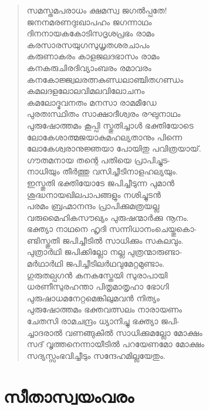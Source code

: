 \begin{verse}
സമസ്തമപരാധം ക്ഷമസ്വ ജഗല്‍പ്പതേ!\\
ജനനമരണദുഃഖാപഹം ജഗന്നാഥം\\
ദിനനായകകോടിസദൃശപ്രഭം രാമം\\
കരസാരസയുഗസുധൃതശരചാപം\\
കരുണാകരം കാളജലദഭാസം രാമം\\
കനകരുചിരദിവ്യാംബരം രമാവരം\\
കനകോജ്ജ്വലരത്നകുണ്ഡലാഞ്ചിതഗണ്ഡം\\
കമലദളലോലവിമലവിലോചനം\\
കമലോദ്ഭവനതം മനസാ രാമമീഡേ\\
പുരതഃസ്ഥിതം സാക്ഷാദീശ്വരം രഘുനാഥം\\
പുരുഷോത്തമം കൂപ്പി സ്തുതിച്ചാള്‍ ഭക്തിയോടെ\\
ലോകേശാത്മജയാകുമഹല്യതാനും പിന്നെ\\
ലോകേശ്വരാനുജ്ഞയാ പോയിതു പവിത്രയായ്.\\
ഗൗതമനായ തന്റെ പതിയെ പ്രാപിച്ചുട-\\
നാധിയും തീര്‍ത്തു വസിച്ചീടിനാളഹല്യയും.\\
ഇസ്തുതി ഭക്തിയോടേ ജപിച്ചീടുന്ന പുമാന്‍\\
ശുദ്ധനായഖിലപാപങ്ങളും നശിച്ചുടന്‍\\
പരമം ബ്രഹ്മാനന്ദം പ്രാപിക്കുമത്രയല്ല\\
വരുമൈഹികസൗഖ്യം പുരുഷന്മാര്‍ക്കു നൂനം.\\
ഭക്ത്യാ നാഥനെ ഹൃദി സന്നിധാനംചെയ്തുകൊ-\\
ണ്ടിസ്തുതി ജപിച്ചീടില്‍ സാധിക്കും സകലവും.\\
പുത്രാര്‍ഥി ജപിക്കില്ലോ നല്ല പുത്രന്മാരുണ്ടാ-\\
മര്‍ഥാര്‍ഥി ജപിച്ചീടിലര്‍ഥവുമേറ്റമുണ്ടാം.\\
ഗുരുതല്പഗന്‍ കനകസ്തേയി സുരാപായി\\
ധരണീസുരഹന്താ പിതൃമാതൃഹാ ഭോഗി\\
പുരുഷാധമനേറ്റമെങ്കിലുമവന്‍ നിത്യം\\
പുരുഷോത്തമം ഭക്തവത്സലം നാരായണം\\
ചേതസി രാമചന്ദ്രം ധ്യാനിച്ചു ഭക്ത്യാ ജപി-\\
ച്ചാദരാല്‍ വണങ്ങുകില്‍ സാധിക്കുമല്ലോ മോക്ഷം\\
സദ് വൃത്തനെന്നായീടില്‍ പറയേണമോ മോക്ഷം\\
സദ്യസ്സംഭവിച്ചീടും സന്ദേഹമില്ലയേതും.
\end{verse}


\section{സീതാസ്വയംവരം}

